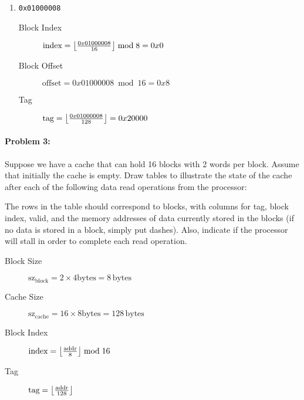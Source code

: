 \documentclass[12pt,letterpaper,titlepage]{article}
\DeclarePairedDelimiter\floor{\lfloor}{\rfloor}
\begin{document}
\begin{raggedright}
\begin{enumerate}
\begin{enumerate}
\begin{description}
    \end{description}
    \item \texttt{0x01000008}
    \begin{description}
    \item[Block Index] $\text{index} = \floor*{\frac{0x01000008}{16}}\bmod 8 = 0x0$ 
    \item[Block Offset] $\text{offset} = 0x01000008\bmod 16 = 0x8$ 
    \item[Tag] $\text{tag} = \floor*{\frac{0x01000008}{128}} = 0x20000$ 
    \end{description}
\end{enumerate}
\end{enumerate}

\clearpage
\paragraph{Problem 3: }

Suppose we have a cache that can hold 16 blocks with 2 words per block.
Assume that initially the cache is empty. Draw tables to illustrate the state of the cache after each of the following data read operations from the processor:

The rows in the table should correspond to blocks, with columns for tag, block index, valid, and the memory addresses of data currently stored in the blocks (if no data is stored in a block, simply put dashes). 
Also, indicate if the processor will stall in order to complete each read operation.
\begin{description}
\item[Block Size] $\text{sz}_\text{block} = 2\times 4 \text{bytes} = 8\,\text{bytes}$
\item[Cache Size] $\text{sz}_\text{cache} = 16\times 8 \text{bytes} = 128\,\text{bytes}$
\item[Block Index] $\text{index} = \floor*{\frac{\text{addr}}{8}} \bmod 16$ 
\item[Tag] $\text{tag} = \floor*{\frac{\text{addr}}{128}}$ 
\end{description}



\end{raggedright}
\end{document}
